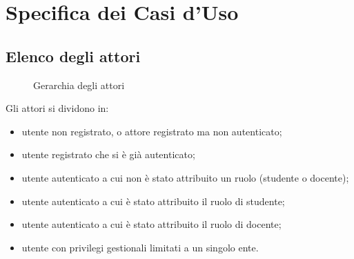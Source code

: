 \documentclass[a4paper, titlepage]{article}
\begin{document}
\newpage

\section{Specifica dei Casi d'Uso}
\subsection{Elenco degli attori}

\begin{figure}[H]
	\centering
	\noindent{}
	\caption{Gerarchia degli attori}
\end{figure}

Gli attori si dividono in:
\begin{itemize}

\item {} utente non registrato, o attore registrato ma non autenticato;
\item {} utente registrato che si è già autenticato;
\item {} utente autenticato a cui non è stato attribuito un ruolo (studente o docente);
\item {} utente autenticato a cui è stato attribuito il ruolo di studente;
\item {} utente autenticato a cui è stato attribuito il ruolo di docente;
\item {} utente con privilegi gestionali limitati a un singolo ente.
\end{itemize}
\end{document}
